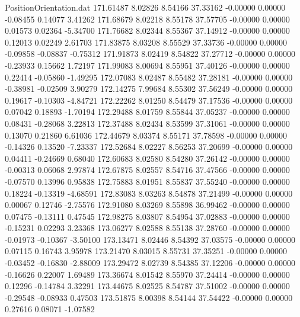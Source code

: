 \begin{filecontents}{PositionOrientation.dat}
 171.61487    8.02826    8.54166    37.33162   -0.00000    0.00000   -0.08455    0.14077    3.41262
 171.68679    8.02218    8.55178    37.57705   -0.00000    0.00000    0.01573    0.02364   -5.34700
 171.76682    8.02344    8.55367    37.14912   -0.00000    0.00000    0.12013    0.02249    2.61703
 171.83875    8.03208    8.55529    37.33736   -0.00000    0.00000   -0.09858   -0.08837   -0.75312
 171.91873    8.02419    8.54822    37.27712   -0.00000    0.00000   -0.23933    0.15662    1.72197
 171.99083    8.00694    8.55951    37.40126   -0.00000    0.00000    0.22414   -0.05860   -1.49295
 172.07083    8.02487    8.55482    37.28181   -0.00000    0.00000   -0.38981   -0.02509    3.90279
 172.14275    7.99684    8.55302    37.56249   -0.00000    0.00000    0.19617   -0.10303   -4.84721
 172.22262    8.01250    8.54479    37.17536   -0.00000    0.00000    0.07042    0.18893   -1.70194
 172.29488    8.01759    8.55844    37.05237   -0.00000    0.00000    0.08431   -0.28068    3.22813
 172.37488    8.02434    8.53599    37.31061   -0.00000    0.00000    0.13070    0.21860    6.61036
 172.44679    8.03374    8.55171    37.78598   -0.00000    0.00000   -0.14326    0.13520   -7.23337
 172.52684    8.02227    8.56253    37.20699   -0.00000    0.00000    0.04411   -0.24669    0.68040
 172.60683    8.02580    8.54280    37.26142   -0.00000    0.00000   -0.00313    0.06068    2.97874
 172.67875    8.02557    8.54716    37.47566   -0.00000    0.00000   -0.07570    0.13996    0.95838
 172.75883    8.01951    8.55837    37.55240   -0.00000    0.00000    0.18224   -0.13319   -4.68591
 172.83083    8.03263    8.54878    37.21499   -0.00000    0.00000    0.00067    0.12746   -2.75576
 172.91080    8.03269    8.55898    36.99462   -0.00000    0.00000    0.07475   -0.13111    0.47545
 172.98275    8.03807    8.54954    37.02883   -0.00000    0.00000   -0.15231    0.02293    3.23368
 173.06277    8.02588    8.55138    37.28760   -0.00000    0.00000   -0.01973   -0.10367   -3.50100
 173.13471    8.02446    8.54392    37.03575   -0.00000    0.00000    0.07115    0.16743    3.95978
 173.21470    8.03015    8.55731    37.35251   -0.00000    0.00000   -0.03452   -0.16830   -2.88009
 173.29472    8.02739    8.54385    37.12206   -0.00000    0.00000   -0.16626    0.22007    1.69489
 173.36674    8.01542    8.55970    37.24414   -0.00000    0.00000    0.12296   -0.14784    3.32291
 173.44675    8.02525    8.54787    37.51002   -0.00000    0.00000   -0.29548   -0.08933    0.47503
 173.51875    8.00398    8.54144    37.54422   -0.00000    0.00000    0.27616    0.08071   -1.07582

\end{filecontents}
